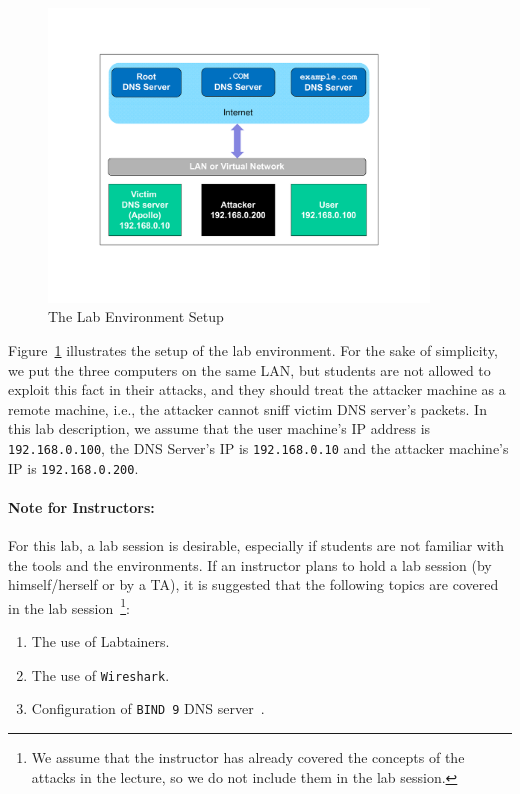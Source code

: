 \begin{figure}[!htb]
\centering
\includegraphics*[viewport=50 120 750 520, width=0.9\textwidth,natwidth=621,natheight=403]{Figs/DNS_Remote_Env.pdf}
\caption{The Lab Environment Setup} 
\label{fig:environment}
\end{figure}


Figure~\ref{fig:environment} illustrates the setup of the lab environment. For the 
sake of simplicity, we put the three computers on the same LAN, but 
students are not allowed to exploit this fact in their attacks, and 
they should treat the attacker machine as a remote machine, 
i.e., the attacker cannot sniff victim DNS server's packets.
In this lab description, we assume that the user machine's IP address is {\tt 192.168.0.100}, 
the DNS Server's IP is {\tt 192.168.0.10} and the attacker machine's IP is {\tt 192.168.0.200}.


\paragraph {Note for Instructors:} 
For this lab, a lab session is desirable, especially if students are
not familiar with the tools and the environments. If an instructor
plans to hold a lab session (by himself/herself or by a TA), it
is suggested that the following topics are covered in the
lab session~\footnote{We assume that the instructor has already covered
the concepts of the attacks in the lecture, so we do not include
them in the lab session.}:
\begin{enumerate}
  \item The use of Labtainers. 

  \item The use of {\tt Wireshark}.

  \item Configuration of {\tt BIND 9} DNS server~\cite{bib2}.
\end{enumerate}


